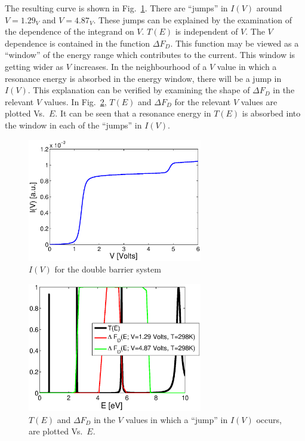 \documentclass[12pt, a4paper]{article}
\begin{document}
The resulting curve is shown in Fig.~\ref{fig:I_V}. There are ``jumps'' in $I(V)$ around $V=1.29_V$ and $V=4.87_V$. These jumps can be explained by the examination of the dependence of the integrand on $V$. $T(E)$ is independent of $V$. The $V$ dependence is contained in the function $\Delta F_D$. This function may be viewed as a ``window'' of the energy range which contributes to the current. This window is getting wider as $V$ increases. In the neighbourhood of a $V$ value in which a resonance energy is absorbed in the energy window, there will be a jump in $I(V)$. This explanation can be verified by examining the shape of $\Delta F_D$ in the relevant $V$ values. In Fig.~\ref{fig:jumps}, $T(E)$ and $\Delta F_D$ for the relevant $V$ values are plotted Vs.\ $E$. It can be seen that a resonance energy in $T(E)$ is absorbed into the window in each of the ``jumps'' in $I(V)$.

\begin{figure}[htb]
	\centering\includegraphics[width=3in]{I_V}
	\caption{$I(V)$ for the double barrier system}\label{fig:I_V}
\end{figure}

\begin{figure}[htb]
	\centering\includegraphics[width=3in]{current_jumps}
	\caption{$T(E)$ and $\Delta F_D$ in the $V$ values in which a ``jump'' in $I(V)$ occurs, are plotted Vs.\ $E$.}\label{fig:jumps}
\end{figure}
\end{document}
